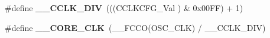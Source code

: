 \begin{DoxyCompactItemize}
\item 
\hypertarget{group___l_p_c17xx___system___defines_ga867e3bcb08aca9d5d486b404a6360d48}{\#define {\bfseries \-\_\-\-\_\-\-C\-C\-L\-K\-\_\-\-D\-I\-V}~(((\-C\-C\-L\-K\-C\-F\-G\-\_\-\-Val      ) \& 0x00\-F\-F) + 1)}\label{group___l_p_c17xx___system___defines_ga867e3bcb08aca9d5d486b404a6360d48}

\item 
\hypertarget{group___l_p_c17xx___system___defines_gab40b7b139fc425dbd3f7adece2e14478}{\#define {\bfseries \-\_\-\-\_\-\-C\-O\-R\-E\-\_\-\-C\-L\-K}~(\-\_\-\-\_\-\-F\-C\-C\-O(\-O\-S\-C\-\_\-\-C\-L\-K) / \-\_\-\-\_\-\-C\-C\-L\-K\-\_\-\-D\-I\-V)}\label{group___l_p_c17xx___system___defines_gab40b7b139fc425dbd3f7adece2e14478}

\end{DoxyCompactItemize}
